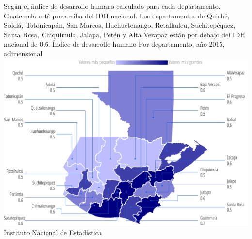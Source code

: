    
   
   
   	{%
 Según el índice de desarrollo humano calculado para cada departamento, Guatemala está por arriba del IDH nacional.
 Los departamentos de Quiché, Sololá, Totonicapán, San Marcos, Huehuetenango, Retalhuleu, Suchitepéquez, Santa Rosa, Chiquimula, Jalapa, Petén y Alta Verapaz están por debajo del IDH nacional de 0.6. 	}%
   	{%
   		Índice de desarrollo humano
   	}%
   	{%
   	Por departamento, año 2015, adimensional} %
   	{%
   		\includegraphics[width=52\cuadri]{graficas/1_11.pdf}}%
   	{%
   		Instituto Nacional de Estadística} %
 
 
 
 
      

